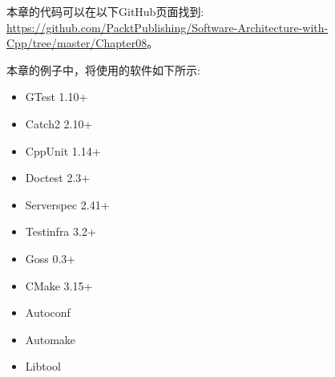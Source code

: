 本章的代码可以在以下GitHub页面找到: \url{https://github.com/PacktPublishing/Software-Architecture-with-Cpp/tree/master/Chapter08}。

本章的例子中，将使用的软件如下所示:

\begin{itemize}
\item 
GTest 1.10+

\item 
Catch2 2.10+

\item 
CppUnit 1.14+

\item 
Doctest 2.3+

\item 
Serverspec 2.41+

\item 
Testinfra 3.2+

\item 
Goss 0.3+

\item 
CMake 3.15+

\item 
Autoconf

\item 
Automake

\item 
Libtool
\end{itemize}